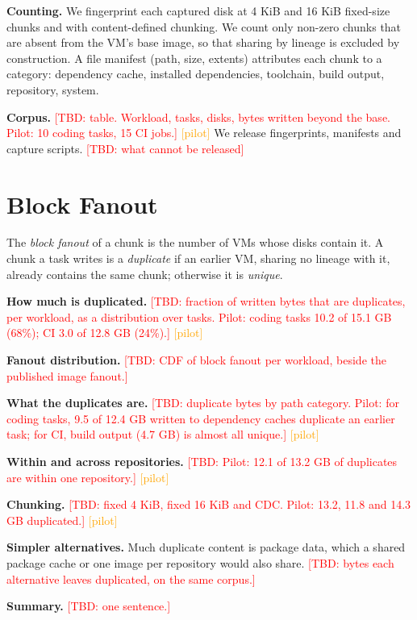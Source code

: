 \documentclass[10pt,twocolumn]{article}
\newcommand{\TBD}[1]{\textcolor{red}{[TBD: #1]}}
\newcommand{\pilot}{\textcolor{orange}{[pilot]}}
\begin{document}
\textbf{Counting.} We fingerprint each captured disk at 4 KiB and 16 KiB fixed-size chunks and with content-defined chunking. We count only non-zero chunks that are absent from the VM's base image, so that sharing by lineage is excluded by construction. A file manifest (path, size, extents) attributes each chunk to a category: dependency cache, installed dependencies, toolchain, build output, repository, system.

\textbf{Corpus.} \TBD{table. Workload, tasks, disks, bytes written beyond the base. Pilot: 10 coding tasks, 15 CI jobs.} \pilot{} We release fingerprints, manifests and capture scripts. \TBD{what cannot be released}

\section{Block Fanout}

The \emph{block fanout} of a chunk is the number of VMs whose disks contain it. A chunk a task writes is a \emph{duplicate} if an earlier VM, sharing no lineage with it, already contains the same chunk; otherwise it is \emph{unique}.

\textbf{How much is duplicated.} \TBD{fraction of written bytes that are duplicates, per workload, as a distribution over tasks. Pilot: coding tasks 10.2 of 15.1 GB (68\%); CI 3.0 of 12.8 GB (24\%).} \pilot{}

\textbf{Fanout distribution.} \TBD{CDF of block fanout per workload, beside the published image fanout.}

\textbf{What the duplicates are.} \TBD{duplicate bytes by path category. Pilot: for coding tasks, 9.5 of 12.4 GB written to dependency caches duplicate an earlier task; for CI, build output (4.7 GB) is almost all unique.} \pilot{}

\textbf{Within and across repositories.} \TBD{Pilot: 12.1 of 13.2 GB of duplicates are within one repository.} \pilot{}

\textbf{Chunking.} \TBD{fixed 4 KiB, fixed 16 KiB and CDC. Pilot: 13.2, 11.8 and 14.3 GB duplicated.} \pilot{}

\textbf{Simpler alternatives.} Much duplicate content is package data, which a shared package cache or one image per repository would also share. \TBD{bytes each alternative leaves duplicated, on the same corpus.}

\textbf{Summary.} \TBD{one sentence.}

\end{document}
